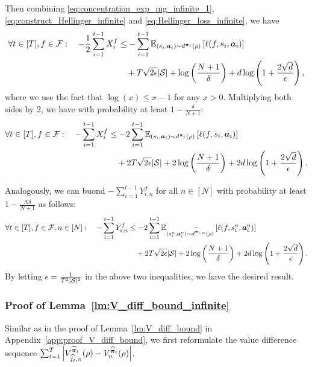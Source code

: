  
 
Then combining \eqref{eq:concentration_exp_mg_infinite_1}, \eqref{eq:construct_Hellinger_infinite} and \eqref{eq:Hellinger_loss_infinite}, we have
\begin{align*}
    \forall t\in[T],f\in{\mathcal{F}}:\quad -\frac{1}{2}\sum_{i=1}^{t-1} X_i^f &\leq -\sum_{i=1}^{t-1} \mathbb{E}_{(s_i,{\bm{a}}_i)\sim d^{{\bm{\pi}}_i}(\rho)}\left[\ell(f,s_i,{\bm{a}}_i)\right] \notag\\
    &\quad+ T\sqrt{2\epsilon}|{\mathcal{S}}| + \log\left(\frac{N+1}{\delta}\right) + d\log\left(1+\frac{2\sqrt{d}}{\epsilon}\right),
\end{align*}
where we use the fact that $\log(x)\leq x-1$ for any $x>0$. Multiplying both sides by 2, we have with probability at least $1-\frac{\delta}{N+1}$:
\begin{align}%
    \forall t\in[T],f\in\gF:\quad -\sum_{i=1}^{t-1} X_i^f &\leq -2\sum_{i=1}^{t-1} \E_{(s_i,\va_i)\sim d^{\vpi_i}(\rho)}\left[\ell(f,s_i,\va_i)\right] \notag\\
    &\quad+ 2T\sqrt{2\epsilon}|\gS| + 2\log\left(\frac{N+1}{\delta}\right) + 2d\log\left(1+\frac{2\sqrt{d}}{\epsilon}\right).
\end{align}

Analogously, we can buond $-\sum_{i=1}^{t-1} Y_{i,n}^f$ for all $n\in[N]$ with probability at least $1-\frac{N\delta}{N+1}$ as follows:
\begin{align}%
    \forall t\in[T],f\in\gF,n\in[N]:\quad -\sum_{i=1}^{t-1} Y_{i,n}^f &\leq -2\sum_{i=1}^{t-1} \E_{(s_i^n,\va_i^n)\sim d^{\widetilde{\vpi}_{i,n}}(\rho)}\left[\ell(f,s_i^n,\va_i^n)\right] \notag\\
    &\quad+ 2T\sqrt{2\epsilon}|\gS| + 2\log\left(\frac{N+1}{\delta}\right) + 2d\log\left(1+\frac{2\sqrt{d}}{\epsilon}\right).
\end{align}
By letting $\epsilon=\frac{1}{T^2|{\mathcal{S}}|^2}$ in the above two inequalities, we have the desired result.

\subsubsection{Proof of Lemma~\ref{lm:V_diff_bound_infinite}}\label{app:proof_V_diff_bound_infinite}
Similar as in the proof of Lemma~\ref{lm:V_diff_bound} in Appendix~\ref{app:proof_V_diff_bound}, we first reformulate the value difference sequence $\sum_{t=1}^T \left|V_{\widehat{f}_{t},n}^{\widehat{{\bm{\pi}}}_{t}}(\rho)-V_{n}^{\widehat{{\bm{\pi}}}_{t}}(\rho)\right|$.

